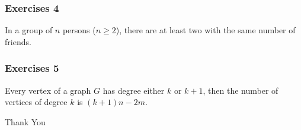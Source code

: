 \documentclass{beamer}
\begin{document}
\begin{frame}
\frametitle{Exercises 4}
	In a group of $n$ persons ($n \ge 2$), there are at least two with the same number of friends.
\end{frame}

\begin{frame}
\frametitle{Exercises 5}
	Every vertex of a graph $G$ has degree either $k$ or $k+1$, then the number of vertices of degree $k$ is $(k+1)n-2m$.
\end{frame}

\begin{frame}
	\vspace{0.6in}
	\hspace{3cm} {\color{blue}\Huge{Thank You}}
\end{frame}
\end{document}
